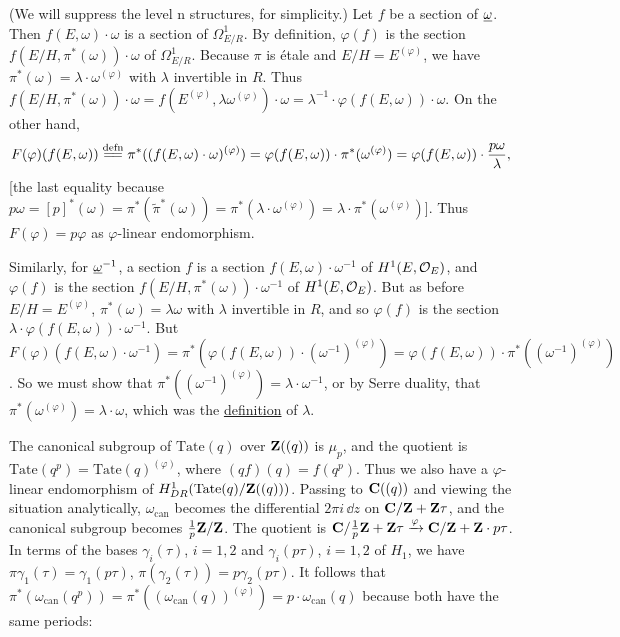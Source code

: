 \begin{kaproof}
(We will suppress the level n structures, for simplicity.) Let $f$ be a section
of $\underline{\omega}$. Then $f(E,\omega)\cdot\omega$ is a section of $\Omega^1_{E/R}$. By
definition, $\varphi(f)$ is the section $f(E/H,\pi^*(\omega))\cdot\omega$ of
$\Omega^1_{E/R}$. Because $\pi$ is \'etale and $E/H=E^{(\varphi)}$, we have
$\pi^*(\omega)=\lambda\cdot\omega^{(\varphi)}$ with $\lambda$ invertible in $R$.
Thus $f(E/H,\pi^*(\omega))\cdot\omega=f(E^{(\varphi)},\lambda\omega^{(\varphi)})
\cdot\omega=\lambda^{-1}\cdot\varphi(f(E,\omega))\cdot\omega$. On the other hand,
\[
F(\varphi)(f(E,\omega))\xlongequal{\text{defn}}
\pi^*((f(E,\omega)\cdot\omega)^{(\varphi)})
=\varphi(f(E,\omega))\cdot\pi^*(\omega^{(\varphi)})
=\varphi(f(E,\omega))\cdot\frac{p\omega}{\lambda},
\]
[the last equality because
$p\omega=[p]^*(\omega)=\pi^*(\widetilde{\pi}^*(\omega))
=\pi^*(\lambda\cdot\omega^{(\varphi)})=\lambda\cdot\pi^*(\omega^{(\varphi)})$].
Thus $F(\varphi)=p\varphi$ as $\varphi$-linear endomorphism.

Similarly, for $\underline{\omega}^{-1}$, a section $f$ is a section
$f(E,\omega)\cdot\omega^{-1}$ of $H^1(E,\mathcal{O}_E)$, and $\varphi(f)$ is the section
$f(E/H,\pi^*(\omega))\cdot\omega^{-1}$ of $H^1(E,\mathcal{O}_E)$. But as before
$E/H=E^{(\varphi)}$, $\pi^*(\omega)=\lambda\omega$ with $\lambda$ invertible in
$R$, and so $\varphi(f)$ is the section $\lambda\cdot\varphi(f(E,\omega))\cdot
\omega^{-1}$. But
$F(\varphi)(f(E,\omega)\cdot\omega^{-1})
=\pi^*(\varphi(f(E,\omega))\cdot(\omega^{-1})^{(\varphi)})
=\varphi(f(E,\omega))\cdot\pi^*((\omega^{-1})^{(\varphi)})$. So we must show
that $\pi^*((\omega^{-1})^{(\varphi)})=\lambda\cdot\omega^{-1}$, or by Serre
duality, that $\pi^*(\omega^{(\varphi)})=\lambda\cdot\omega$, which was the
\uline{definition} of $\lambda$.
\end{kaproof}


The canonical subgroup of $\mathrm{Tate}(q)$ over $\mathbf{Z}((q))$ is $\mu_p$, and the
quotient is $\mathrm{Tate}(q^p)=\mathrm{Tate}(q)^{(\varphi)}$, where
$(qf)(q)=f(q^p)$. Thus we also have a $\varphi$-linear endomorphism of
$H^1_{DR}(\mathrm{Tate}(q)/\mathbf{Z}((q)))$. Passing to $\mathbf{C}((q))$ and viewing the
situation analytically, $\omega_{\mathrm{can}}$ becomes the differential
$2\pi i\,\dd z$ on $\mathbf{C}/\mathbf{Z}+\mathbf{Z}\tau$, and the canonical subgroup becomes
$\frac{1}{p}\mathbf{Z}/\mathbf{Z}$. The quotient is
$\mathbf{C}/\frac{1}{p}\mathbf{Z}+\mathbf{Z}\tau\xrightarrow{\varphi}\mathbf{C}/\mathbf{Z}+\mathbf{Z}\cdot p\tau$. In terms of
the bases $\gamma_i(\tau)$, $i=1,2$ and $\gamma_i(p\tau)$, $i=1,2$ of $H_1$, we
have $\pi\gamma_1(\tau)=\gamma_1(p\tau)$, $\pi(\gamma_2(\tau))=p\gamma_2(p\tau)$.
It follows that
$\pi^*(\omega_{\mathrm{can}}(q^p))=\pi^*((\omega_{\mathrm{can}}(q))^{(\varphi)})
=p\cdot\omega_{\mathrm{can}}(q)$ because both have the same periods:


